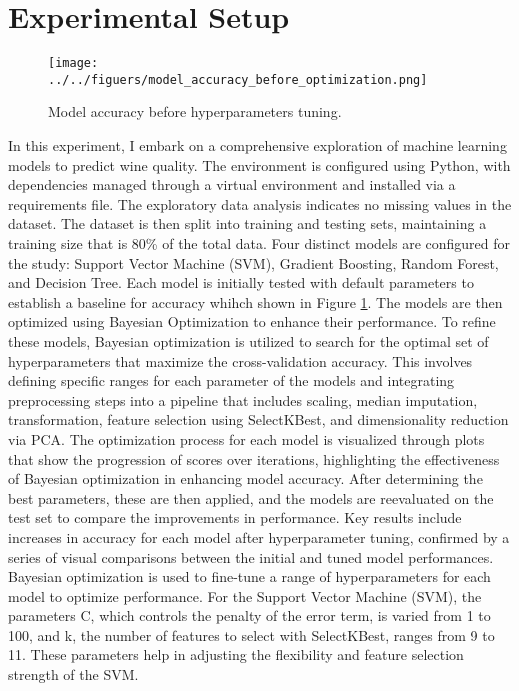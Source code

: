 \documentclass[
	letterpaper, %
	12pt, %
	unnumberedsections, %
	twoside, %
]{LTJournalArticle}
\begin{document}
\section{Experimental Setup}
\begin{figure}
	\texttt{[image: ../../figuers/model\_accuracy\_before\_optimization.png]}
	\caption{Model accuracy before hyperparameters tuning.}
	\label{fig:model_accuracy_before_optimization}
\end{figure}
In this experiment, I embark on a comprehensive exploration of machine learning models to predict wine quality. The environment is configured using Python, with dependencies managed through a virtual environment and installed via a requirements file. The exploratory data analysis indicates no missing values in the dataset. The dataset is then split into training and testing sets, maintaining a training size that is 80\% of the total data. Four distinct models are configured for the study: Support Vector Machine (SVM), Gradient Boosting, Random Forest, and Decision Tree. Each model is initially tested with default parameters to establish a baseline for accuracy whihch shown in Figure \ref {fig:model_accuracy_before_optimization}. The models are then optimized using Bayesian Optimization to enhance their performance. To refine these models, Bayesian optimization is utilized to search for the optimal set of hyperparameters that maximize the cross-validation accuracy. This involves defining specific ranges for each parameter of the models and integrating preprocessing steps into a pipeline that includes scaling, median imputation, transformation, feature selection using SelectKBest, and dimensionality reduction via PCA. The optimization process for each model is visualized through plots that show the progression of scores over iterations, highlighting the effectiveness of Bayesian optimization in enhancing model accuracy. After determining the best parameters, these are then applied, and the models are reevaluated on the test set to compare the improvements in performance. Key results include increases in accuracy for each model after hyperparameter tuning, confirmed by a series of visual comparisons between the initial and tuned model performances. Bayesian optimization is used to fine-tune a range of hyperparameters for each model to optimize performance. For the Support Vector Machine (SVM), the parameters C, which controls the penalty of the error term, is varied from 1 to 100, and k, the number of features to select with SelectKBest, ranges from 9 to 11. These parameters help in adjusting the flexibility and feature selection strength of the SVM.
\end{document}
